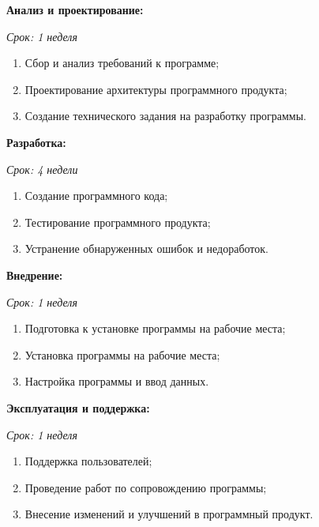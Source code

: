     \textbf{Анализ и проектирование:}
    
    \textit{Срок: 1 неделя}

    \begin{enumerate}
            
    \item    Сбор и анализ требований к программе;
    \item    Проектирование архитектуры программного продукта;
    \item    Создание технического задания на разработку программы.
        
    \end{enumerate}

    \textbf{Разработка:}
    
    \textit{Срок: 4 недели}
    
    \begin{enumerate}

    \item    Создание программного кода;
    \item    Тестирование программного продукта;
    \item    Устранение обнаруженных ошибок и недоработок.
        
    \end{enumerate}

    \textbf{Внедрение:}
    
    \textit{Срок: 1 неделя}

    \begin{enumerate}

    \item    Подготовка к установке программы на рабочие места;
    \item    Установка программы на рабочие места;
    \item    Настройка программы и ввод данных.

    \end{enumerate}
    
    \textbf{Эксплуатация и поддержка:}
    
    \textit{Срок: 1 неделя}

    \begin{enumerate}
            
    \item    Поддержка пользователей;
    \item    Проведение работ по сопровождению программы;
    \item    Внесение изменений и улучшений в программный продукт.
        
    \end{enumerate}

